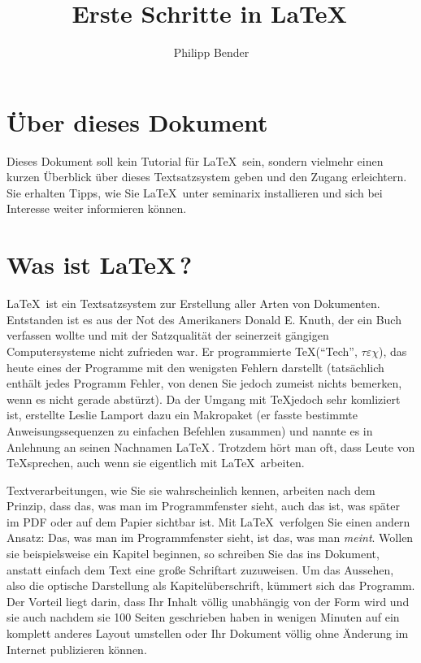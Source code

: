 \documentclass[a4paper,10pt]{scrartcl}
\title{Erste Schritte in \LaTeX \,}
\author{Philipp Bender}
\begin{document}
\maketitle

\section*{Über dieses Dokument}
Dieses Dokument soll kein Tutorial für \LaTeX \, sein, sondern vielmehr einen kurzen Überblick über dieses Textsatzsystem geben und den Zugang erleichtern. Sie erhalten Tipps, wie Sie \LaTeX \, unter seminarix installieren und sich bei Interesse weiter informieren können.

\section*{Was ist \LaTeX \,?}
\LaTeX \, ist ein Textsatzsystem zur Erstellung aller Arten von Dokumenten. Entstanden ist es aus der Not des Amerikaners Donald E. Knuth, der ein Buch verfassen wollte und mit der Satzqualität der seinerzeit gängigen Computersysteme nicht zufrieden war. Er programmierte \TeX ("`Tech"', $\tau \varepsilon \chi$), das heute eines der Programme mit den wenigsten Fehlern darstellt (tatsächlich enthält jedes Programm Fehler, von denen Sie jedoch zumeist nichts bemerken, wenn es nicht gerade abstürzt). Da der Umgang mit \TeX jedoch sehr komliziert ist, erstellte Leslie Lamport dazu ein Makropaket (er fasste bestimmte Anweisungssequenzen zu einfachen Befehlen zusammen) und nannte es in Anlehnung an seinen Nachnamen \LaTeX \,. Trotzdem hört man oft, dass Leute von \TeX sprechen, auch wenn sie eigentlich mit \LaTeX \, arbeiten.

Textverarbeitungen, wie Sie sie wahrscheinlich kennen, arbeiten nach dem Prinzip, dass das, was man im Programmfenster sieht, auch das ist, was später im PDF oder auf dem Papier sichtbar ist. Mit \LaTeX \, verfolgen Sie einen andern Ansatz: Das, was man im Programmfenster sieht, ist das, was man \emph{meint}. Wollen sie beispielsweise ein Kapitel beginnen, so schreiben Sie das ins Dokument, anstatt einfach dem Text eine große Schriftart zuzuweisen. Um das Aussehen, also die optische Darstellung als Kapitelüberschrift, kümmert sich das Programm. Der Vorteil liegt darin, dass Ihr Inhalt völlig unabhängig von der Form wird und sie auch nachdem sie 100 Seiten geschrieben haben in wenigen Minuten auf ein komplett anderes Layout umstellen oder Ihr Dokument völlig ohne Änderung im Internet publizieren können.
\end{document}
